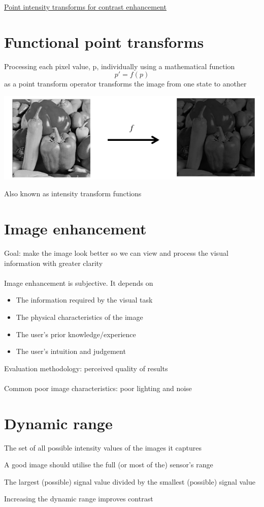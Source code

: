 \documentclass{article}[18pt]
\begin{document}
\begin{center}
\underline{\huge Point intensity transforms for contrast enhancement}
\end{center}
\section{Functional point transforms}
Processing each pixel value, p, individually using a mathematical function
$$p'=f(p)$$
as a point transform operator transforms the image from one state to another
\begin{center}
	\includegraphics[scale=0.7]{functional}
\end{center}
Also known as intensity transform functions
\section{Image enhancement}
Goal: make the image look better so we can view and process the visual information with greater clarity\\
\\
Image enhancement is subjective. It depends on
\begin{itemize}
	\item The information required by the visual task
	\item The physical characteristics of the image
	\item The user's prior knowledge/experience
	\item The user's intuition and judgement
\end{itemize}
Evaluation methodology: perceived quality of results\\
\\
Common poor image characteristics: poor lighting and noise
\section{Dynamic range}
\begin{defin}
The set of all possible intensity values of the images it captures
\end{defin}
A good image should utilise the full (or most of the) sensor's range
\begin{defin}
The largest (possible) signal value divided by the smallest (possible) signal value
\end{defin}
Increasing the dynamic range improves contrast
\end{document}
